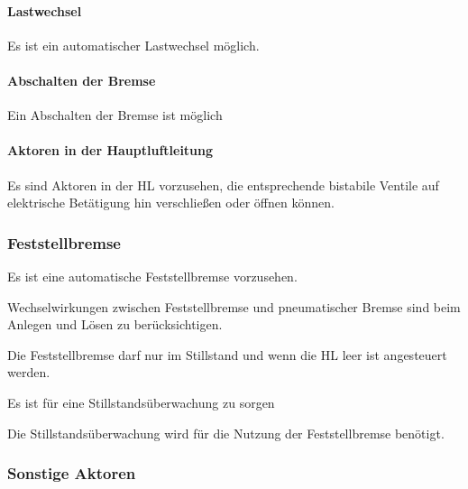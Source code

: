 \paragraph{Lastwechsel}
\begin{feat}
Es ist ein automatischer Lastwechsel möglich.
\end{feat}

\paragraph{Abschalten der Bremse}
\begin{feat}
Ein Abschalten der Bremse ist möglich
\end{feat}

\paragraph{Aktoren in der Hauptluftleitung}
\begin{feat}
Es sind Aktoren in der \acrshort{HL} vorzusehen, die entsprechende bistabile Ventile auf elektrische Betätigung hin verschließen oder öffnen können.
\end{feat}

\subsubsection{Feststellbremse}
\begin{feat}
Es ist eine automatische Feststellbremse vorzusehen.
\end{feat}
\begin{feat}
Wechselwirkungen zwischen Feststellbremse und pneumatischer Bremse sind beim Anlegen und Lösen zu berücksichtigen.
\end{feat}
\begin{rem}[zu Anf. 20]
Die Feststellbremse darf nur im Stillstand und wenn die HL leer ist angesteuert werden.
\end{rem}
\begin{feat}
Es ist für eine Stillstandsüberwachung zu sorgen
\end{feat}
\begin{rem}[zu Anf. 20]
Die Stillstandsüberwachung wird für die Nutzung der Feststellbremse benötigt.
\end{rem}

\subsubsection{Sonstige Aktoren}
